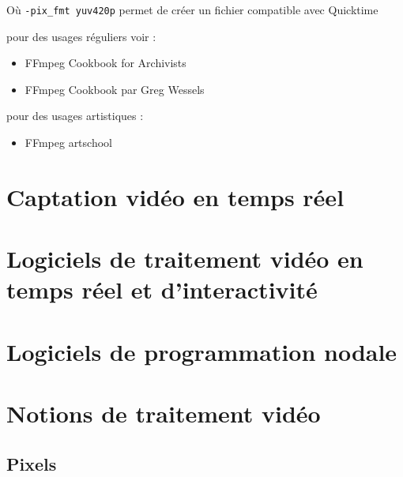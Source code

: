 \documentclass[
]{book}
\providecommand{\tightlist}{%
  \setlength{\itemsep}{0pt}\setlength{\parskip}{0pt}}
\begin{document}
Où \texttt{-pix\_fmt\ yuv420p} permet de créer un fichier compatible avec Quicktime

pour des usages réguliers voir :

\begin{itemize}
\tightlist
\item
  FFmpeg Cookbook for Archivists \citep{kromer_FFmpegCookbookArchivists_2020}
\item
  FFmpeg Cookbook par Greg Wessels \citep{wessels_FFmpegCookbook_2017}
\end{itemize}

pour des usages artistiques :

\begin{itemize}
\tightlist
\item
  FFmpeg artschool \citep{associationofmovingimagearchivists_FFmpegArtschool_2020}
\end{itemize}

\hypertarget{captation-viduxe9o-en-temps-ruxe9el}{%
\section{Captation vidéo en temps réel}\label{captation-viduxe9o-en-temps-ruxe9el}}

\hypertarget{logiciels-de-traitement-viduxe9o-en-temps-ruxe9el-et-dinteractivituxe9}{%
\section{Logiciels de traitement vidéo en temps réel et d'interactivité}\label{logiciels-de-traitement-viduxe9o-en-temps-ruxe9el-et-dinteractivituxe9}}

\hypertarget{logiciels-de-programmation-nodale}{%
\section{Logiciels de programmation nodale}\label{logiciels-de-programmation-nodale}}

\hypertarget{notions-de-traitement-viduxe9o}{%
\section{Notions de traitement vidéo}\label{notions-de-traitement-viduxe9o}}

\hypertarget{pixels}{%
\subsection{Pixels}\label{pixels}}
\end{document}
